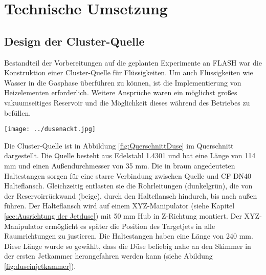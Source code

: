 \chapter{Technische Umsetzung} 

\section{Design der Cluster-Quelle} \label{sec:Quelle}

Bestandteil der Vorbereitungen auf die geplanten Experimente an FLASH war die Konstruktion einer Cluster-Quelle für Flüssigkeiten. Um auch Flüssigkeiten wie Wasser in die Gasphase überführen zu können, ist die Implementierung von Heizelementen erforderlich. Weitere Ansprüche waren ein möglichst großes vakuumseitiges Reservoir und die Möglichkeit dieses während des Betriebes zu befüllen. 


\begin{center}
\begin{minipage}{1\linewidth}
\centering
\texttt{[image: ../dusenackt.jpg]}%
 \label{fig:dusenackt}
\end{minipage} 
\end{center} 

Die Cluster-Quelle ist in Abbildung \ref{fig:QuerschnittDuse} im Querschnitt dargestellt. Die Quelle besteht aus Edelstahl 1.4301 und hat eine Länge von 114 mm und einen Außendurchmesser von 35 mm. Die in braun angedeuteten Haltestangen sorgen für eine starre Verbindung zwischen Quelle und CF DN40 Halteflansch. Gleichzeitig entlasten sie die Rohrleitungen (dunkelgrün), die von der Reservoirrückwand (beige), durch den Halteflansch hindurch, bis nach außen führen. Der Halteflansch wird auf einem XYZ-Manipulator (siehe Kapitel \ref{sec:Ausrichtung der Jetduse}) mit 50 mm Hub in Z-Richtung montiert. Der XYZ-Manipulator ermöglicht es später die Position des Targetjets in alle Raumrichtungen zu justieren. Die Haltestangen haben eine Länge von 240 mm. Diese Länge wurde so gewählt, dass die Düse beliebig nahe an den Skimmer in der ersten Jetkammer herangefahren werden kann (siehe Abildung \ref{fig:duseinjetkammer}).

